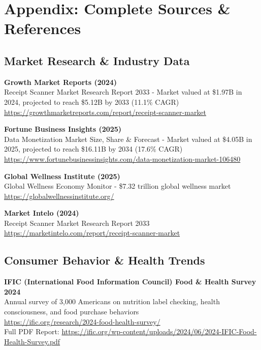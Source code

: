 \documentclass[11pt,a4paper]{report}
\begin{document}
\vspace{1.5cm}

\chapter*{Appendix: Complete Sources \& References}

\section*{Market Research \& Industry Data}

\textbf{Growth Market Reports (2024)}\\
Receipt Scanner Market Research Report 2033 - Market valued at \$1.97B in 2024, projected to reach \$5.12B by 2033 (11.1\% CAGR)\\
\url{https://growthmarketreports.com/report/receipt-scanner-market}

\textbf{Fortune Business Insights (2025)}\\
Data Monetization Market Size, Share \& Forecast - Market valued at \$4.05B in 2025, projected to reach \$16.11B by 2034 (17.6\% CAGR)\\
\url{https://www.fortunebusinessinsights.com/data-monetization-market-106480}

\textbf{Global Wellness Institute (2025)}\\
Global Wellness Economy Monitor - \$7.32 trillion global wellness market\\
\url{https://globalwellnessinstitute.org/}

\textbf{Market Intelo (2024)}\\
Receipt Scanner Market Research Report 2033\\
\url{https://marketintelo.com/report/receipt-scanner-market}

\section*{Consumer Behavior \& Health Trends}

\textbf{IFIC (International Food Information Council) Food \& Health Survey 2024}\\
Annual survey of 3,000 Americans on nutrition label checking, health consciousness, and food purchase behaviors\\
\url{https://ific.org/research/2024-food-health-survey/}\\
Full PDF Report: \url{https://ific.org/wp-content/uploads/2024/06/2024-IFIC-Food-Health-Survey.pdf}
\end{document}
